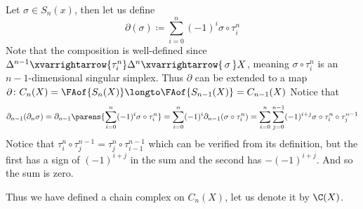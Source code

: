 Let $\sigma\in S_n(x)$, then let us define
$$ \partial(\sigma) \coloneqq \sum_{i=0}^n(-1)^i\sigma\circ\tau_i^n $$
Note that the composition is well-defined since $\Delta^{n-1}\xvarrightarrow{\tau_i^n}\Delta^n\xvarrightarrow{\,\sigma\,}X$, meaning $\sigma\circ\tau_i^n$ is an $n-1$-dimensional singular simplex.
Thus $\partial$ can be extended to a map $\partial\colon C_n(X)=\FAof{S_n(X)}\longto\FAof{S_{n-1}(X)}=C_{n-1}(X)$
Notice that
$$ \partial_{n-1}(\partial_n\sigma) = \partial_{n-1}\parens{\sum_{i=0}^n(-1)^i\sigma\circ\tau_i^n} = \sum_{i=0}^n(-1)^i\partial_{n-1}(\sigma\circ\tau_i^n) =
\sum_{i=0}^n\sum_{j=0}^{n-1}(-1)^{i+j}\sigma\circ\tau_i^n\circ\tau_j^{n-1} $$
Notice that $\tau^n_i\circ\tau_j^{n-1}=\tau^n_j\circ\tau^{n-1}_{i-1}$ which can be verified from its definition, but the first has a sign of $(-1)^{i+j}$ in the sum and the second has $-(-1)^{i+j}$.
And so the sum is zero.

Thus we have defined a chain complex on $C_n(X)$, let us denote it by $\C(X)$.

